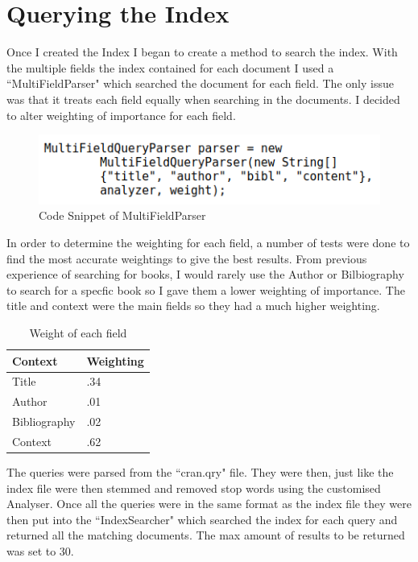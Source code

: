 \newpage
\section{Querying the Index}
Once I created the Index I began to create a method to search the index. With the multiple fields the index contained for each document I used a ``MultiFieldParser" which searched the document for each field. The only issue was that it treats each field equally when searching in the documents.  I decided to alter weighting of importance for each field. \par

	\begin{figure}[ht!]
		\begin{center}
			\includegraphics[scale=.5 ]{6} 
			\caption{Code Snippet of MultiFieldParser}
			\label{fig:1}
		\end{center}
	\end{figure} \par
  
In order to determine the weighting for each field, a number of tests were done to find the most accurate weightings to give the best results. From previous experience of searching for books, I would rarely use the Author or Bilbiography to search for a specfic book so I gave them a lower weighting of importance. The title and context were the main fields so they had a much higher weighting. \par

	\begin{table}[H]
		\centering
		\begin{tabular}{|p{2.5cm}|p{2.5cm}|}
			\hline
			\textbf{Context} 	& \textbf{Weighting} \\ \hline	
			Title 				& .34 \\ \hline
			Author 				& .01 \\ \hline
			Bibliography 		& .02 \\ \hline
			Context 			& .62 \\ \hline
		\end{tabular}
		\caption{Weight of each field}
		\label{table:weight}
	\end{table}

The queries were parsed from the ``cran.qry" file. They were then, just like the index file were then stemmed and removed stop words using the customised Analyser. Once all the queries were in the same format as the index file they were then put into the ``IndexSearcher" which searched the index for each query and returned all the matching documents. The max amount of results to be returned was set to 30.

